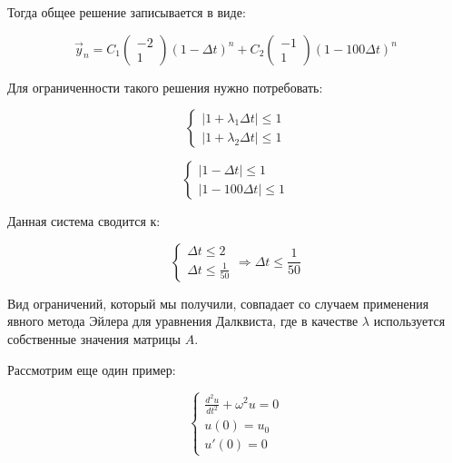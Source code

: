 \documentclass[10pt,a4paper]{article}
\begin{document}
	Тогда общее решение записывается в виде:
	
	\begin{equation}
		\vec{y}_{n} = C_{1}\begin{pmatrix}
			-2\\1
			\end{pmatrix} \left(1 - \Delta t\right)^{n} + 
			C_{2} \begin{pmatrix}
			-1\\1
			\end{pmatrix}\left(1 - 100\Delta t\right)^{n}
	\end{equation}
	
	Для ограниченности такого решения нужно потребовать:
	
	\begin{equation}
		\begin{cases}
			\left|1 + \lambda_{1}\Delta t\right| \leqslant 1
			\\
			\left|1 + \lambda_{2}\Delta t\right| \leqslant 1
		\end{cases}
	\end{equation}
	
	\begin{equation}
		\begin{cases}
			\left|1 - \Delta t\right| \leqslant 1
			\\
			\left|1 - 100\Delta t\right| \leqslant 1
		\end{cases}
	\end{equation}
	
	Данная система сводится к:
	
	\begin{equation}
		\begin{cases}
			\Delta t\leqslant 2
			\\
			\Delta t \leqslant \frac{1}{50}
		\end{cases}
		\Rightarrow \Delta t \leqslant \frac{1}{50}
	\end{equation}
	
	Вид ограничений, который мы получили, совпадает со случаем применения явного 
	метода Эйлера для уравнения Далквиста, где в качестве $\lambda$ используется 
	собственные значения матрицы $A$. 
	
	Рассмотрим еще один пример:
	
	\begin{equation}
		\begin{cases}
			\frac{d^{2}u}{dt^{2}} + \omega^{2}u = 0
			\\
			u\left(0\right) = u_{0}
			\\
			u'\left(0\right) = 0
		\end{cases}
	\end{equation}
	
\end{document}
